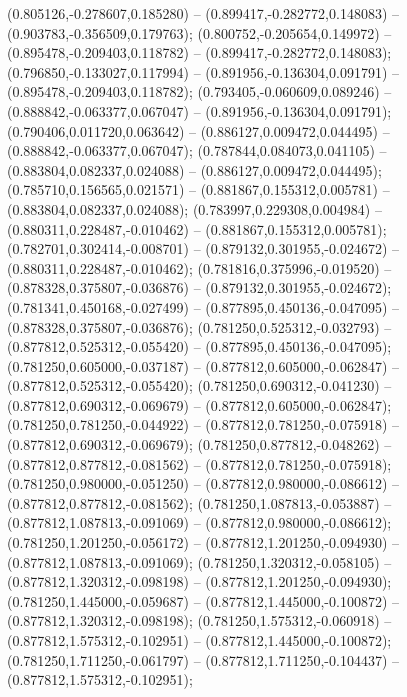  (0.805126,-0.278607,0.185280) -- (0.899417,-0.282772,0.148083) -- (0.903783,-0.356509,0.179763);
 (0.800752,-0.205654,0.149972) -- (0.895478,-0.209403,0.118782) -- (0.899417,-0.282772,0.148083);
 (0.796850,-0.133027,0.117994) -- (0.891956,-0.136304,0.091791) -- (0.895478,-0.209403,0.118782);
 (0.793405,-0.060609,0.089246) -- (0.888842,-0.063377,0.067047) -- (0.891956,-0.136304,0.091791);
 (0.790406,0.011720,0.063642) -- (0.886127,0.009472,0.044495) -- (0.888842,-0.063377,0.067047);
 (0.787844,0.084073,0.041105) -- (0.883804,0.082337,0.024088) -- (0.886127,0.009472,0.044495);
 (0.785710,0.156565,0.021571) -- (0.881867,0.155312,0.005781) -- (0.883804,0.082337,0.024088);
 (0.783997,0.229308,0.004984) -- (0.880311,0.228487,-0.010462) -- (0.881867,0.155312,0.005781);
 (0.782701,0.302414,-0.008701) -- (0.879132,0.301955,-0.024672) -- (0.880311,0.228487,-0.010462);
 (0.781816,0.375996,-0.019520) -- (0.878328,0.375807,-0.036876) -- (0.879132,0.301955,-0.024672);
 (0.781341,0.450168,-0.027499) -- (0.877895,0.450136,-0.047095) -- (0.878328,0.375807,-0.036876);
 (0.781250,0.525312,-0.032793) -- (0.877812,0.525312,-0.055420) -- (0.877895,0.450136,-0.047095);
 (0.781250,0.605000,-0.037187) -- (0.877812,0.605000,-0.062847) -- (0.877812,0.525312,-0.055420);
 (0.781250,0.690312,-0.041230) -- (0.877812,0.690312,-0.069679) -- (0.877812,0.605000,-0.062847);
 (0.781250,0.781250,-0.044922) -- (0.877812,0.781250,-0.075918) -- (0.877812,0.690312,-0.069679);
 (0.781250,0.877812,-0.048262) -- (0.877812,0.877812,-0.081562) -- (0.877812,0.781250,-0.075918);
 (0.781250,0.980000,-0.051250) -- (0.877812,0.980000,-0.086612) -- (0.877812,0.877812,-0.081562);
 (0.781250,1.087813,-0.053887) -- (0.877812,1.087813,-0.091069) -- (0.877812,0.980000,-0.086612);
 (0.781250,1.201250,-0.056172) -- (0.877812,1.201250,-0.094930) -- (0.877812,1.087813,-0.091069);
 (0.781250,1.320312,-0.058105) -- (0.877812,1.320312,-0.098198) -- (0.877812,1.201250,-0.094930);
 (0.781250,1.445000,-0.059687) -- (0.877812,1.445000,-0.100872) -- (0.877812,1.320312,-0.098198);
 (0.781250,1.575312,-0.060918) -- (0.877812,1.575312,-0.102951) -- (0.877812,1.445000,-0.100872);
 (0.781250,1.711250,-0.061797) -- (0.877812,1.711250,-0.104437) -- (0.877812,1.575312,-0.102951);
